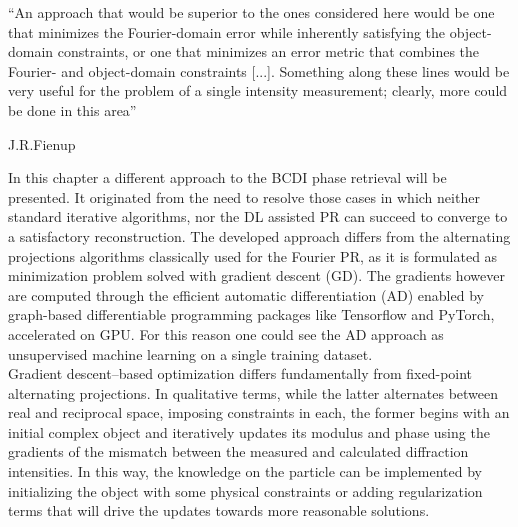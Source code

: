 
\epigraph{``An approach that would be superior to the ones considered here would be one that minimizes the Fourier-domain error while inherently satisfying the object-domain
constraints, or one that minimizes an error metric that combines the Fourier- and object-domain constraints [...]. 
Something along these lines would be very useful for the problem of a single intensity measurement; clearly, 
more could be done in this area''}{J.R.Fienup \cite{fienup_phase_1982}}

In this chapter a different approach to the BCDI phase retrieval will be presented. It originated from the need to resolve 
those cases in which neither standard iterative algorithms, nor the DL assisted PR can succeed to converge to a satisfactory 
reconstruction. The developed approach differs from the alternating projections algorithms classically used for 
the Fourier PR, as it is formulated as minimization problem solved with gradient descent (GD). The gradients however are computed 
through the efficient automatic differentiation (AD) enabled by graph-based differentiable programming packages like Tensorflow and 
PyTorch, accelerated on GPU. For this reason one could see the AD approach as unsupervised machine learning on a single training 
dataset.\\ 
Gradient descent–based optimization differs fundamentally from fixed-point alternating projections. In qualitative 
terms, while the latter alternates between real and reciprocal space, imposing constraints in each, the former begins 
with an initial complex object and iteratively updates its modulus and phase using the gradients of the mismatch between 
the measured and calculated diffraction intensities. In this way, the knowledge on the particle can be implemented 
by initializing the object with some physical constraints or adding regularization terms that will drive the updates 
towards more reasonable solutions. \\


